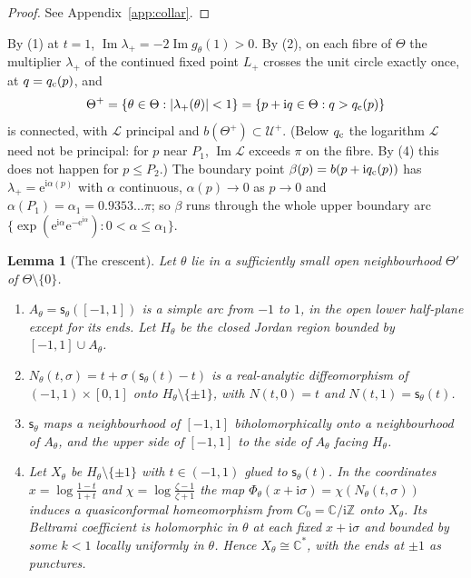 \documentclass[11pt]{amsart}
\newtheorem{lemma}[theorem]{Lemma}
\theoremstyle{definition}
\newcommand{\eee}{\mathrm{e}}
\newcommand{\ii}{\mathrm{i}}
\begin{document}
\begin{proof}
See Appendix~\ref{app:collar}.
\end{proof}

By (1) at $t=1$, $\operatorname{Im}\lambda_+=-2\operatorname{Im}g_\theta(1)>0$.  By (2), on each fibre of $\Theta$ the
multiplier $\lambda_+$ of the continued fixed point $L_+$ crosses the unit circle exactly
once, at $q=q_{\rm c}(p)$, and
\[
 \Theta^+=\{\theta\in\Theta:|\lambda_+(\theta)|<1\}=\{p+\ii q\in\Theta:q>q_{\rm c}(p)\}
\]
is connected, with $\mathcal L$ principal and $b(\Theta^+)\subset\mathcal U^+$.  (Below $q_{\rm c}$ the
logarithm $\mathcal L$ need not be principal: for $p$ near $P_1$, $\operatorname{Im}\mathcal L$ exceeds $\pi$ on the
fibre.  By (4) this does not happen for $p\le P_2$.)  The boundary
point $\beta(p)=b(p+\ii q_{\rm c}(p))$ has $\lambda_+=\eee^{\ii\alpha(p)}$ with $\alpha$ continuous,
$\alpha(p)\to0$ as $p\to0$ and $\alpha(P_1)=\alpha_1=0.9353\ldots\pi$; so $\beta$ runs through the whole
upper boundary arc $\{\exp(\eee^{\ii\alpha}\eee^{-\eee^{\ii\alpha}}):0<\alpha\le\alpha_1\}$.

\begin{lemma}[The crescent]\label{lem:far-crescent}
Let $\theta$ lie in a sufficiently small open neighbourhood $\Theta'$ of $\Theta\setminus\{0\}$.
\begin{enumerate}
\item $A_\theta=\mathsf s_\theta([-1,1])$ is a simple arc from $-1$ to $1$, in the open lower
  half-plane except for its ends.  Let $H_\theta$ be the closed Jordan region bounded
  by $[-1,1]\cup A_\theta$.
\item $N_\theta(t,\sigma)=t+\sigma(\mathsf s_\theta(t)-t)$ is a real-analytic diffeomorphism of
  $(-1,1)\times[0,1]$ onto $H_\theta\setminus\{\pm1\}$, with $N(t,0)=t$ and $N(t,1)=\mathsf s_\theta(t)$.
\item $\mathsf s_\theta$ maps a neighbourhood of $[-1,1]$ biholomorphically onto a neighbourhood
  of $A_\theta$, and the upper side of $[-1,1]$ to the side of $A_\theta$ facing $H_\theta$.
\item Let $X_\theta$ be $H_\theta\setminus\{\pm1\}$ with $t\in(-1,1)$ glued to $\mathsf s_\theta(t)$.  In the
  coordinates $x=\log\frac{1-t}{1+t}$ and $\chi=\log\frac{\zeta-1}{\zeta+1}$ the map
  $\Phi_\theta(x+\ii\sigma)=\chi(N_\theta(t,\sigma))$ induces a quasiconformal homeomorphism from
  $C_0=\mathbb C/\ii\mathbb Z$ onto $X_\theta$.  Its Beltrami coefficient is holomorphic in $\theta$ at
  each fixed $x+\ii\sigma$ and bounded by some $k<1$ locally uniformly in $\theta$.
  Hence $X_\theta\cong\mathbb C^*$, with the ends at $\pm1$ as punctures.
\end{enumerate}
\end{lemma}
\end{document}
